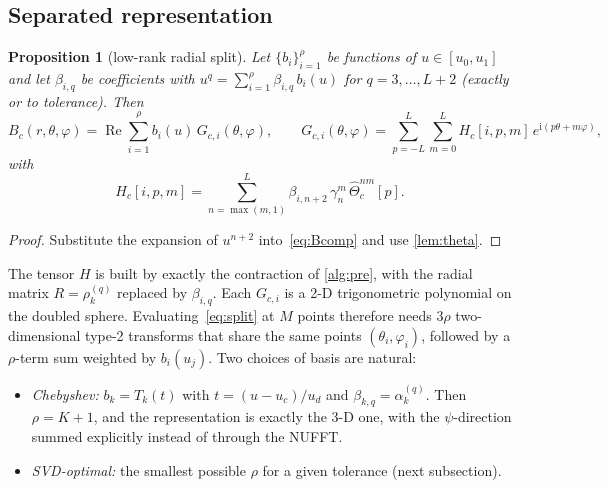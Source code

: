 \documentclass[11pt,a4paper]{article}
\newtheorem{proposition}{Proposition}
\theoremstyle{remark}
\newcommand{\Th}{\Theta}
\renewcommand{\Re}{\operatorname{Re}}
\begin{document}
\subsection{Separated representation}

\begin{proposition}[low-rank radial split]\label{prop:split}
Let $\{b_i\}_{i=1}^{\rho}$ be functions of $u\in[u_0,u_1]$ and let $\beta_{i,q}$ be coefficients with
$u^q=\sum_{i=1}^{\rho}\beta_{i,q}\,b_i(u)$ for $q=3,\dots,L+2$ (exactly or to tolerance). Then
\begin{equation}\label{eq:split}
B_c(r,\theta,\varphi)=\Re\sum_{i=1}^{\rho}b_i(u)\,G_{c,i}(\theta,\varphi),\qquad
G_{c,i}(\theta,\varphi)=\sum_{p=-L}^{L}\sum_{m=0}^{L}H_c[i,p,m]\,e^{\mathrm i(p\theta+m\varphi)},
\end{equation}
with
\begin{equation}\label{eq:H}
H_c[i,p,m]=\sum_{n=\max(m,1)}^{L}\beta_{i,n+2}\,\gamma_n^m\,\hat\Th_c^{nm}[p].
\end{equation}
\end{proposition}
\begin{proof}
Substitute the expansion of $u^{n+2}$ into~\eqref{eq:Bcomp} and use \cref{lem:theta}.
\end{proof}
The tensor $H$ is built by exactly the contraction of \cref{alg:pre}, with the radial matrix
$R=\rho^{(q)}_k$ replaced by $\beta_{i,q}$. Each $G_{c,i}$ is a 2-D trigonometric polynomial on the
doubled sphere. Evaluating~\eqref{eq:split} at $M$ points therefore needs $3\rho$ two-dimensional
type-2 transforms that share the same points $(\theta_i,\varphi_i)$, followed by a $\rho$-term sum
weighted by $b_i(u_j)$. Two choices of basis are natural:
\begin{itemize}
\item \emph{Chebyshev:} $b_k=T_k(t)$ with $t=(u-u_c)/u_d$ and $\beta_{k,q}=\alpha_k^{(q)}$. Then $\rho=K+1$,
  and the representation is exactly the 3-D one, with the $\psi$-direction summed explicitly instead
  of through the NUFFT.
\item \emph{SVD-optimal:} the smallest possible $\rho$ for a given tolerance (next subsection).
\end{itemize}
\end{document}
